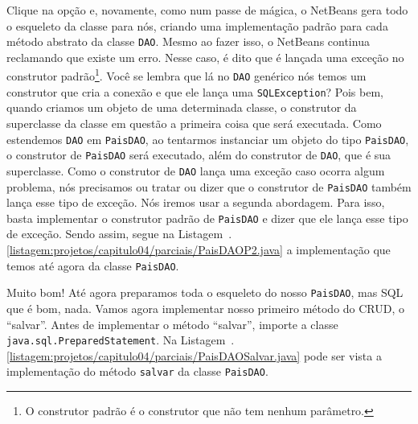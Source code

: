 Clique na opção  e, novamente, como num passe de mágica, o NetBeans gera todo o esqueleto da classe para nós, criando uma implementação padrão para cada método abstrato da classe \texttt{DAO}. Mesmo ao fazer isso, o NetBeans continua reclamando que existe um erro. Nesse caso, é dito que é lançada uma exceção no construtor padrão\footnote{O construtor padrão é o construtor que não tem nenhum parâmetro.}. Você se lembra que lá no \texttt{DAO} genérico nós temos um construtor que cria a conexão e que ele lança uma \texttt{SQLException}? Pois bem, quando criamos um objeto de uma determinada classe, o construtor da superclasse da classe em questão a primeira coisa que será executada. Como estendemos \texttt{DAO} em \texttt{PaisDAO}, ao tentarmos instanciar um objeto do tipo \texttt{PaisDAO}, o construtor de \texttt{PaisDAO} será executado, além do construtor de \texttt{DAO}, que é sua superclasse. Como o construtor de \texttt{DAO} lança uma exceção caso ocorra algum problema, nós precisamos ou tratar ou dizer que o construtor de \texttt{PaisDAO} também lança esse tipo de exceção. Nós iremos usar a segunda abordagem. Para isso, basta implementar o construtor padrão de \texttt{PaisDAO} e dizer que ele lança esse tipo de exceção. Sendo assim, segue na Listagem~\thechapter.\ref{listagem:projetos/capitulo04/parciais/PaisDAOP2.java} a implementação que temos até agora da classe \texttt{PaisDAO}.


Muito bom! Até agora preparamos toda o esqueleto do nosso \texttt{PaisDAO}, mas SQL que é bom, nada. Vamos agora implementar nosso primeiro método do CRUD, o ``salvar''. Antes de implementar o método ``salvar'', importe a classe \texttt{java.sql.PreparedStatement}. Na Listagem~\thechapter.\ref{listagem:projetos/capitulo04/parciais/PaisDAOSalvar.java} pode ser vista a implementação do método \texttt{salvar} da classe \texttt{PaisDAO}.


